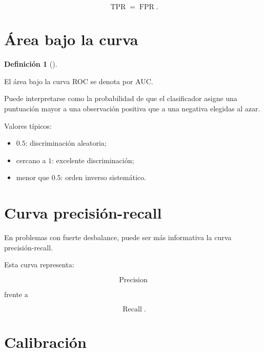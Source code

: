 \documentclass[
  spanish,
  10.5pt,
  letterpaper,
  DIV=11,
  numbers=noendperiod,
  oneside,
  open=any]{scrreprt}
\providecommand{\tightlist}{%
  \setlength{\itemsep}{0pt}\setlength{\parskip}{0pt}}
\theoremstyle{definition}
\newtheorem{definition}{Definición}[chapter]
\theoremstyle{definition}
\theoremstyle{plain}
\theoremstyle{remark}
\begin{document}
\[
\operatorname{TPR}
=
\operatorname{FPR}.
\]

\section*{Área bajo la curva}\label{uxe1rea-bajo-la-curva}


\begin{definition}[]\protect\hypertarget{def-auc}{}\label{def-auc}

El área bajo la curva ROC se denota por AUC.

\end{definition}

Puede interpretarse como la probabilidad de que el clasificador asigne
una puntuación mayor a una observación positiva que a una negativa
elegidas al azar.

Valores típicos:

\begin{itemize}
\tightlist
\item
  \(0.5\): discriminación aleatoria;
\item
  cercano a \(1\): excelente discriminación;
\item
  menor que \(0.5\): orden inverso sistemático.
\end{itemize}

\section*{Curva precisión-recall}\label{curva-precisiuxf3n-recall}


En problemas con fuerte desbalance, puede ser más informativa la curva
precisión-recall.

Esta curva representa:

\[
\operatorname{Precision}
\]

frente a

\[
\operatorname{Recall}.
\]

\section*{Calibración}\label{calibraciuxf3n}

\end{document}
